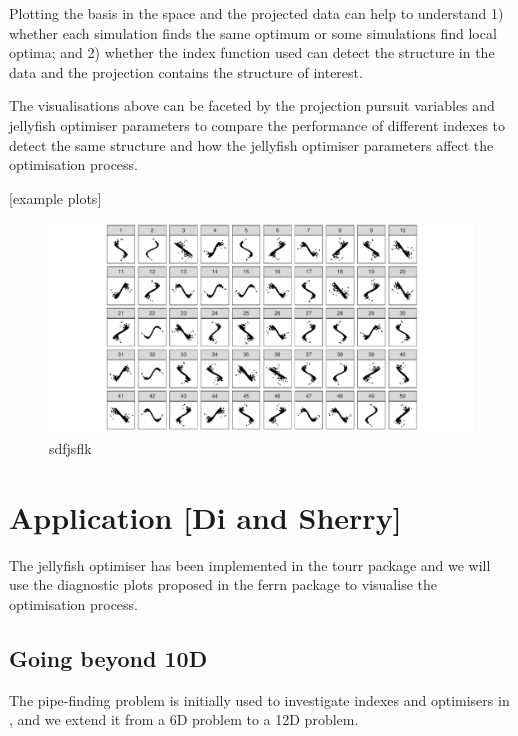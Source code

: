 \documentclass[
  number,
  preprint,
  3p]{elsarticle}
\begin{document}
Plotting the basis in the space and the projected data can help to
understand 1) whether each simulation finds the same optimum or some
simulations find local optima; and 2) whether the index function used
can detect the structure in the data and the projection contains the
structure of interest.

The visualisations above can be faceted by the projection pursuit
variables and jellyfish optimiser parameters to compare the performance
of different indexes to detect the same structure and how the jellyfish
optimiser parameters affect the optimisation process.

{[}example plots{]}

\begin{figure}[H]

{\centering \includegraphics{optim_files/figure-pdf/unnamed-chunk-4-1.pdf}

}

\caption{sdfjsflk}

\end{figure}%

\section{Application {[}Di and Sherry{]}}\label{sec-simulation}

The jellyfish optimiser has been implemented in the tourr package
\citep{wickham_tourr_2011} and we will use the diagnostic plots proposed
in the ferrn package \citep{RJ-2021-105} to visualise the optimisation
process.

\subsection{Going beyond 10D}\label{going-beyond-10d}

The pipe-finding problem is initially used to investigate indexes and
optimisers in \citet{laa_using_2020}, and we extend it from a 6D problem
to a 12D problem.
\end{document}
